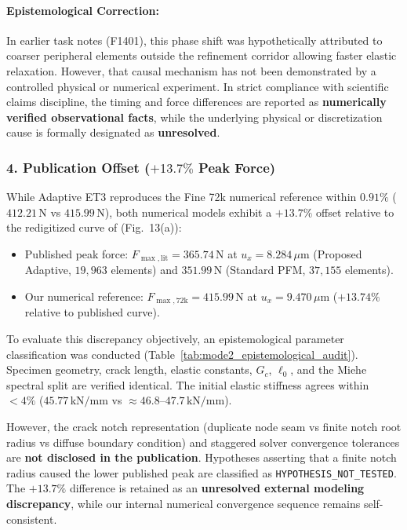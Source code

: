 \paragraph{Epistemological Correction:} In earlier task notes (F1401), this phase shift was hypothetically attributed to coarser peripheral elements outside the refinement corridor allowing faster elastic relaxation. However, that causal mechanism has not been demonstrated by a controlled physical or numerical experiment. In strict compliance with scientific claims discipline, the timing and force differences are reported as \textbf{numerically verified observational facts}, while the underlying physical or discretization cause is formally designated as \textbf{unresolved}.

\subsubsection{4. Publication Offset ($+13.7\%$ Peak Force)}
While Adaptive ET3 reproduces the Fine 72k numerical reference within $0.91\%$ ($412.21\,\mathrm{N}$ vs $415.99\,\mathrm{N}$), both numerical models exhibit a $+13.7\%$ offset relative to the redigitized curve of \citet{pandey2025} (Fig.~13(a)):
\begin{itemize}
  \item Published peak force: $F_{\max,\mathrm{lit}} = 365.74\,\mathrm{N}$ at $u_x = 8.284\,\mu\mathrm{m}$ (Proposed Adaptive, $19{,}963$ elements) and $351.99\,\mathrm{N}$ (Standard PFM, $37{,}155$ elements).
  \item Our numerical reference: $F_{\max,72\mathrm{k}} = 415.99\,\mathrm{N}$ at $u_x = 9.470\,\mu\mathrm{m}$ ($+13.74\%$ relative to published curve).
\end{itemize}
To evaluate this discrepancy objectively, an epistemological parameter classification was conducted (Table~\ref{tab:mode2_epistemological_audit}). Specimen geometry, crack length, elastic constants, $G_c$, $\ell_0$, and the Miehe spectral split are verified identical. The initial elastic stiffness agrees within $<4\%$ ($45.77\,\mathrm{kN/mm}$ vs $\approx 46.8\text{--}47.7\,\mathrm{kN/mm}$). 

However, the crack notch representation (duplicate node seam vs finite notch root radius vs diffuse boundary condition) and staggered solver convergence tolerances are \textbf{not disclosed in the publication}. Hypotheses asserting that a finite notch radius caused the lower published peak are classified as \texttt{HYPOTHESIS\_}\allowbreak\texttt{NOT\_}\allowbreak\texttt{TESTED}. The $+13.7\%$ difference is retained as an \textbf{unresolved external modeling discrepancy}, while our internal numerical convergence sequence remains self-consistent.

